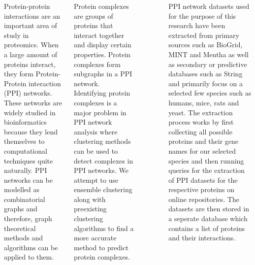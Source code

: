 \documentclass[25pt, a0paper, landscape, margin=0mm, innermargin=15mm, blockverticalspace=15mm, colspace=15mm, subcolspace=8mm]{tikzposter}
\begin{document}
\begin{columns}
    {
        Protein-protein interactions are an important area of study in proteomics. When a large amount of proteins interact, they form Protein-Protein interaction (PPI) networks. These networks are widely studied in bioinformatics because they lend themselves to computational techniques quite naturally. 
        PPI networks can be modelled as combinatorial graphs and therefore, graph theoretical methods and algorithms can be applied to them. 
        
        Protein complexes are groups of proteins that interact together and display certain properties. Protein complexes form subgraphs in a PPI network. Identifying protein complexes 
        is a major problem in PPI network analysis where clustering methods can be used to detect complexes in PPI networks. We attempt to use ensemble clustering along with preexisting clustering algorithms to find a more accurate method to predict protein complexes. 
    }
    {
        \begin{tikzfigure}
            \includegraphics[width=0.15\textwidth]{images/systemdiag.png}
        \end{tikzfigure}
    }
    {
        PPI network datasets used for the purpose of this research have been extracted from primary sources such as BioGrid, MINT and Mentha as well as secondary or predictive databases such as String and primarily focus on a selected few species such as humans, mice, rats and yeast. The extraction process works by first collecting all possible proteins and their gene names for our selected species and then running queries for the extraction of PPI datasets for the respective proteins on online repositories. The datasets are then stored in a seperate database which contains a list of proteins and their interactions.
    }
 


\end{columns}
\end{document}
